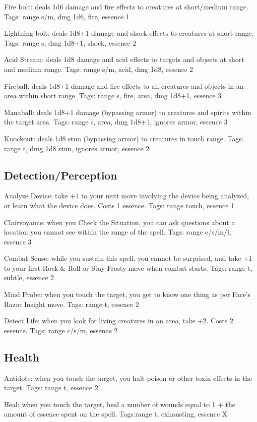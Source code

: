 Fire bolt: deals 1d6 damage and fire effects to creatures at short/medium range. Tags: range s/m, dmg 1d6, fire, essence 1

Lightning bolt: deals 1d8+1 damage and shock effects to creatures at short range. Tags: range s, dmg 1d8+1, shock, essence 2

Acid Stream: deals 1d8 damage and acid effects to targets and objects at short and medium range. Tags: range s/m, acid, dmg 1d8, essence 2

Fireball: deals 1d8+1 damage and fire effects to all creatures and objects in an area within short range. Tags: range s, fire, area, dmg 1d8+1, essence 3

Manaball: deals 1d8+1 damage (bypassing armor) to creatures and spirits within the target area. Tags: range s, area, dmg 1d8+1, ignores armor, essence 3

Knockout: deals 1d8 stun (bypassing armor) to creatures in touch range. Tags: range t, dmg 1d8 stun, ignores armor, essence 2


\subsection{Detection/Perception}
Analyze Device: take +1 to your next move involving the device being analyzed, or learn what the device does. Costs 1 essence. Tags: range touch, essence 1

Clairvoyance: when you Check the Situation, you can ask questions about a location you cannot see within the range of the spell. Tags: range c/s/m/l, essence 3

Combat Sense: while you sustain this spell, you cannot be surprised, and take +1 to your first Rock \& Roll or Stay Frosty move when combat starts. Tags: range t, subtle, essence 2

Mind Probe: when you touch the target, you get to know one thing as per Face’s Razor Insight move. Tags: range t, essence 2

Detect Life: when you look for living creatures in an area, take +2. Costs 2 essence. Tags: range c/s/m, essence 2


\subsection{Health}
Antidote: when you touch the target, you halt poison or other toxin effects in the target. Tags: range t, essence 2

Heal: when you touch the target, heal a number of wounds equal to 1 + the amount of essence spent on the spell. Tags:range t, exhausting, essence X

